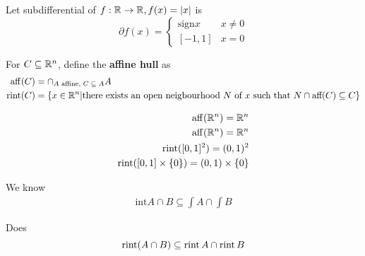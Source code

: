 \begin{exmp}
  \label{defn:cones_and_generalized_inequalities:4}
  Let subdifferential of $f: \mathbb{R} \rightarrow \mathbb{R}, f(x) = |x|$ is
  \begin{equation}
    \label{eq:40}
    \partial f(x) = \begin{cases}
      \text{sign} x & x \neq 0 \\
      [-1, 1] & x = 0
    \end{cases}
  \end{equation}
\end{exmp}


\begin{defn}
  \label{defn:cones_and_generalized_inequalities:5}
  For $C \subseteq \mathbb{R}^{n}$, define the \textbf{affine hull} as
  \begin{align}
    \operatorname*{aff}(C) &= \cap_{\text{$A$ affine, $C \subseteq A$}} A \\
    \operatorname*{rint}(C) &= \{ x \in \mathbb{R}^{n} | \text{there exists an open
      neigbourhood $N$ of $x$ such that $N \cap \text{aff}(C)
      \subseteq C$} \}
  \end{align}
\end{defn}

\begin{exmp}
  \label{defn:cones_and_generalized_inequalities:6}
  \begin{align}
    \label{eq:42}
    \operatorname*{aff}(\mathbb{R}^{n}) = \mathbb{R}^{n} \\
    \operatorname*{aff}(\mathbb{R}^{n}) = \mathbb{R}^{n} \\
    \operatorname*{rint}([0, 1]^{2}) = (0, 1)^{2} \\
    \operatorname*{rint}([0, 1] \times \{ 0 \}) = (0, 1) \times \{ 0 \}
  \end{align}
\end{exmp}

\begin{exer}
  We know \begin{align}
    \label{eq:32}
    \text{int} A \cap B \subseteq \int A \cap \int B
  \end{align}

  Does
  \begin{equation}
    \label{eq:41}
    \operatorname*{rint}(A \cap B) \subseteq \operatorname*{rint} A \cap \operatorname*{rint} B
  \end{equation}

\end{exer}

